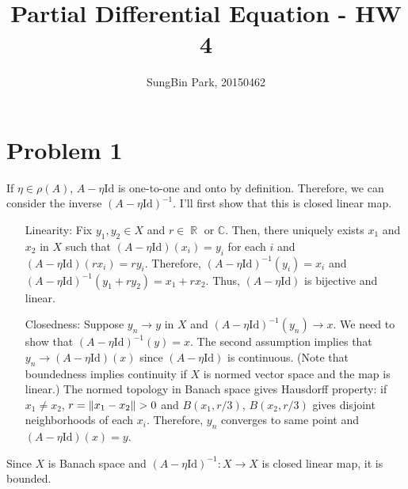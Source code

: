 \documentclass{article}
\DeclareMathOperator{\rr}{\mathbb{R}}
\begin{document}
\title{Partial Differential Equation - HW 4}
\author{SungBin Park, 20150462} 

 \maketitle

\section*{Problem 1}
If $\eta\in \rho(A)$, $A-\eta \text{Id}$ is one-to-one and onto by definition. Therefore, we can consider the inverse $(A-\eta \text{Id})^{-1}$. I'll first show that this is closed linear map.
\begin{enumerate}
\item[Linearity:] Fix $y_1, y_2\in X$ and $r\in \rr$ or $\mathbb{C}$. Then, there uniquely exists $x_1$ and $x_2$ in $X$ such that $(A-\eta \text{Id})(x_i)=y_i$ for each $i$ and $(A-\eta \text{Id})(rx_i)=ry_i$. Therefore, $(A-\eta \text{Id})^{-1}(y_i)=x_i$ and $(A-\eta \text{Id})^{-1}(y_1+ry_2)=x_1+rx_2$. Thus, $(A-\eta \text{Id})$ is bijective and linear.
\item[Closedness:] Suppose $y_n\rightarrow y$ in $X$ and $(A-\eta \text{Id})^{-1}(y_n)\rightarrow x$. We need to show that $(A-\eta \text{Id})^{-1}(y)=x$. The second assumption implies that $y_n\rightarrow (A-\eta \text{Id})(x)$ since $(A-\eta \text{Id})$ is continuous. (Note that boundedness implies continuity if $X$ is normed vector space and the map is linear.) The normed topology in Banach space gives Hausdorff property: if $x_1\neq x_2$, $r=\norm{x_1-x_2}>0$ and $B(x_1, r/3)$, $B(x_2, r/3)$ gives disjoint neighborhoods of each $x_i$. Therefore, $y_n$ converges to same point and $(A-\eta \text{Id})(x)=y$.
\end{enumerate}
Since $X$ is Banach space and $(A-\eta \text{Id})^{-1}:X\rightarrow X$ is closed linear map, it is bounded.
\end{document}

